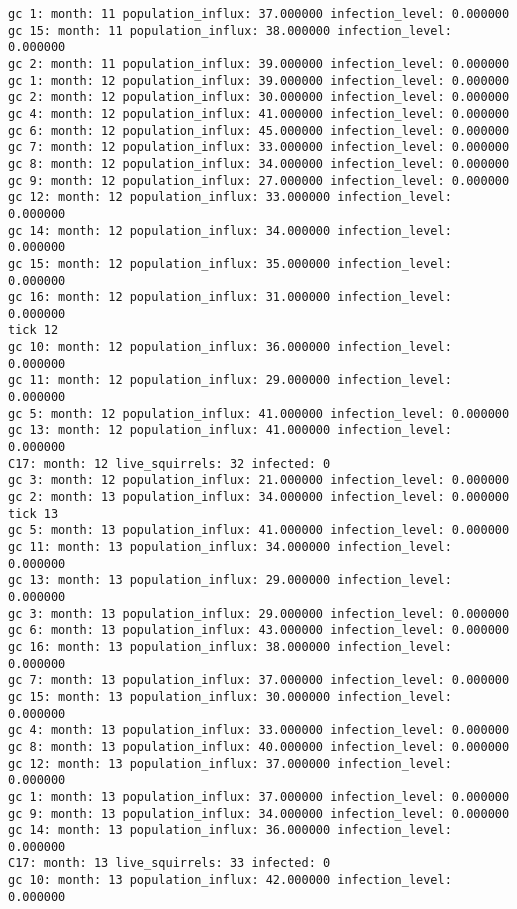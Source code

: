 \begin{lstlisting}[basicstyle=\tiny]
gc 1: month: 11 population_influx: 37.000000 infection_level: 0.000000
gc 15: month: 11 population_influx: 38.000000 infection_level: 0.000000
gc 2: month: 11 population_influx: 39.000000 infection_level: 0.000000
gc 1: month: 12 population_influx: 39.000000 infection_level: 0.000000
gc 2: month: 12 population_influx: 30.000000 infection_level: 0.000000
gc 4: month: 12 population_influx: 41.000000 infection_level: 0.000000
gc 6: month: 12 population_influx: 45.000000 infection_level: 0.000000
gc 7: month: 12 population_influx: 33.000000 infection_level: 0.000000
gc 8: month: 12 population_influx: 34.000000 infection_level: 0.000000
gc 9: month: 12 population_influx: 27.000000 infection_level: 0.000000
gc 12: month: 12 population_influx: 33.000000 infection_level: 0.000000
gc 14: month: 12 population_influx: 34.000000 infection_level: 0.000000
gc 15: month: 12 population_influx: 35.000000 infection_level: 0.000000
gc 16: month: 12 population_influx: 31.000000 infection_level: 0.000000
tick 12
gc 10: month: 12 population_influx: 36.000000 infection_level: 0.000000
gc 11: month: 12 population_influx: 29.000000 infection_level: 0.000000
gc 5: month: 12 population_influx: 41.000000 infection_level: 0.000000
gc 13: month: 12 population_influx: 41.000000 infection_level: 0.000000
C17: month: 12 live_squirrels: 32 infected: 0
gc 3: month: 12 population_influx: 21.000000 infection_level: 0.000000
gc 2: month: 13 population_influx: 34.000000 infection_level: 0.000000
tick 13
gc 5: month: 13 population_influx: 41.000000 infection_level: 0.000000
gc 11: month: 13 population_influx: 34.000000 infection_level: 0.000000
gc 13: month: 13 population_influx: 29.000000 infection_level: 0.000000
gc 3: month: 13 population_influx: 29.000000 infection_level: 0.000000
gc 6: month: 13 population_influx: 43.000000 infection_level: 0.000000
gc 16: month: 13 population_influx: 38.000000 infection_level: 0.000000
gc 7: month: 13 population_influx: 37.000000 infection_level: 0.000000
gc 15: month: 13 population_influx: 30.000000 infection_level: 0.000000
gc 4: month: 13 population_influx: 33.000000 infection_level: 0.000000
gc 8: month: 13 population_influx: 40.000000 infection_level: 0.000000
gc 12: month: 13 population_influx: 37.000000 infection_level: 0.000000
gc 1: month: 13 population_influx: 37.000000 infection_level: 0.000000
gc 9: month: 13 population_influx: 34.000000 infection_level: 0.000000
gc 14: month: 13 population_influx: 36.000000 infection_level: 0.000000
C17: month: 13 live_squirrels: 33 infected: 0
gc 10: month: 13 population_influx: 42.000000 infection_level: 0.000000

\end{lstlisting}
